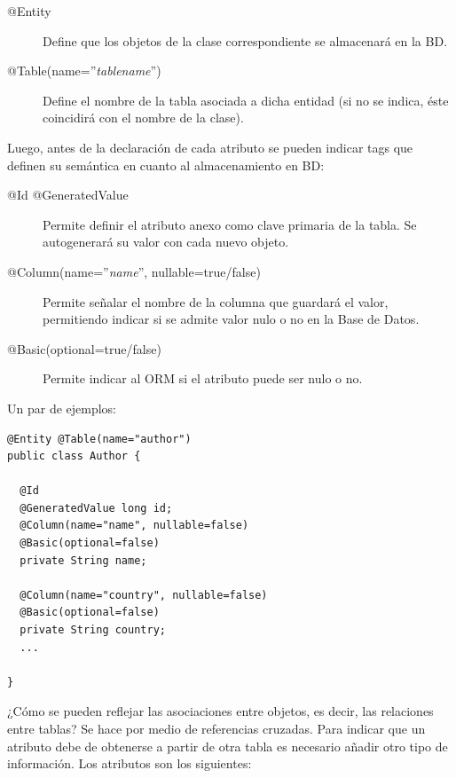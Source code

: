 \documentclass[11pt]{article}
\begin{document}
\begin{description}

\item[@Entity] Define que los objetos de la clase correspondiente se almacenará en la BD. 

\item[@Table(name=''\emph{tablename}'')] Define el nombre de la tabla asociada a dicha entidad (si no se indica, éste coincidirá con el nombre de la clase).

\end{description}


Luego, antes de la declaración de cada atributo se pueden indicar tags que definen su semántica en cuanto al almacenamiento en BD:

\begin{description}

\item[@Id @GeneratedValue] Permite definir el atributo anexo como clave primaria de la tabla. Se autogenerará su valor con cada nuevo objeto.

\item[@Column(name=''\emph{name}'', nullable=true/false)] Permite señalar el nombre de la columna que guardará  el valor, permitiendo indicar si se admite valor nulo o no en la Base de Datos. 

\item[@Basic(optional=true/false)] Permite indicar al ORM si el atributo puede ser nulo o no.


\end{description}

Un par de ejemplos:

\begin{lstlisting}
@Entity @Table(name="author")
public class Author {

  @Id
  @GeneratedValue long id;
  @Column(name="name", nullable=false)
  @Basic(optional=false)
  private String name;

  @Column(name="country", nullable=false)
  @Basic(optional=false)
  private String country;
  ...

}
\end{lstlisting}


¿Cómo se pueden reflejar las asociaciones entre objetos, es decir, las relaciones entre tablas? Se hace por medio de referencias cruzadas. Para indicar que un atributo debe de obtenerse a partir de
otra tabla es necesario añadir otro tipo de información. Los atributos son los siguientes:
\end{document}
